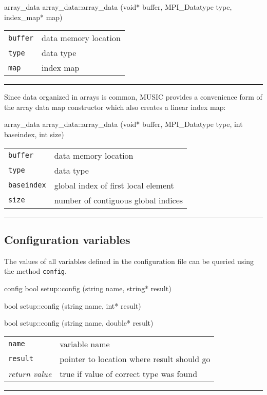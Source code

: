 \documentclass[a4paper,twoside]{report}
\makeatletter
\newenvironment{parameters}%
{\begin{tabular}{@{\hspace{2em}}lp{0.6\textwidth}}}%
{\end{tabular}\par\vspace{1mm}\par\hrule\par\vspace{5mm}}
\makeatother
\begin{document}
\begin{head}{array_data}
  array_data::array_data (void* buffer, MPI_Datatype type,
                          index_map* map)
\end{head}
\begin{parameters}
  \lstinline|buffer| & data memory location \\
  \lstinline|type|   & data type \\
  \lstinline|map|    & index map \\
\end{parameters}

Since data organized in arrays is common, MUSIC provides a convenience
form of the array data map constructor which also creates a linear
index map:

\begin{head}{array_data}
  array_data::array_data (void* buffer,
                          MPI_Datatype type,
                          int  baseindex,
                          int size)
\end{head}
\begin{parameters}
  \lstinline|buffer|    & data memory location \\
  \lstinline|type|	& data type \\
  \lstinline|baseindex| & global index of first local element \\
  \lstinline|size|      & number of contiguous global indices \\
\end{parameters}


\subsection{Configuration variables}

The values of all variables defined in the configuration file can be
queried using the method \lstinline|config|.

\begin{head}{config}
  bool setup::config (string name, string* result)

  bool setup::config (string name, int* result)

  bool setup::config (string name, double* result)
\end{head}
\begin{parameters}
  \lstinline|name|     & variable name \\
  \lstinline|result|  & pointer to location where result should go \\
  \emph{return value} & true if value of correct type was found \\
\end{parameters}
\end{document}
